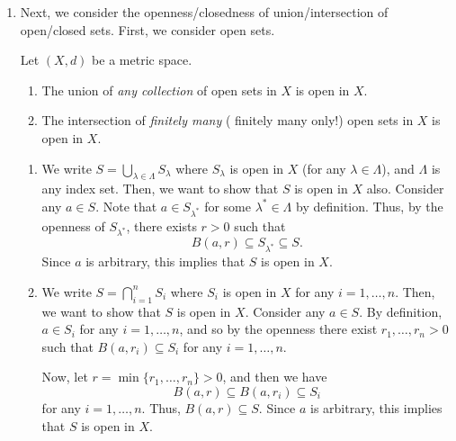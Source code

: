 \begin{enumerate}
\item Next, we consider the openness/closedness of union/intersection of
open/closed sets. First, we consider open sets.
\begin{proposition}
Let \((X,d)\) be a metric space.
\begin{enumerate}
\item \label{it:open-sets-union-open} The union of \emph{any collection} of open sets in \(X\) is open in \(X\).
\item \label{it:open-sets-intersect-open} The intersection of \emph{finitely
many} (\warn{} finitely many only!) open sets in \(X\) is open in \(X\).
\end{enumerate}
\end{proposition}
\begin{pf}
\begin{enumerate}
\item We write \(S=\bigcup_{\lambda\in\Lambda}S_{\lambda}\) where
\(S_{\lambda}\) is open in \(X\) (for any \(\lambda\in\Lambda\)), and
\(\Lambda\) is any index set. Then, we want to show that \(S\) is open in \(X\)
also. Consider any \(a\in S\). Note that \(a\in S_{\lambda^{*}}\) for some
\(\lambda^{*}\in\Lambda\) by definition. Thus, by the openness of \(S_{\lambda^{*}}\),
there exists \(r>0\) such that
\[
B(a,r)\subseteq S_{\lambda^{*}}\subseteq S.
\]
Since \(a\) is arbitrary, this implies that \(S\) is open in \(X\).

\item We write \(S=\bigcap_{i=1}^{n}S_i\) where \(S_{i}\) is open
in \(X\) for any \(i=1,\dotsc,n\). Then, we want to show that \(S\) is open in
\(X\).  Consider any \(a\in S\). By definition, \(a\in S_i\) for any
\(i=1,\dotsc,n\), and so by the openness there exist \(r_1,\dotsc,r_n>0\) such
that \(B(a,r_i)\subseteq S_i\) for any \(i=1,\dotsc,n\).

Now, let \(r=\min\{r_1,\dotsc,r_n\}>0\), and then we have
\[
B(a,r)\subseteq B(a,r_i)\subseteq S_i
\]
for any \(i=1,\dotsc,n\). Thus, \(B(a,r)\subseteq S\). Since \(a\) is
arbitrary, this implies that \(S\) is open in \(X\).
\end{enumerate}
\end{pf}


\end{enumerate}
